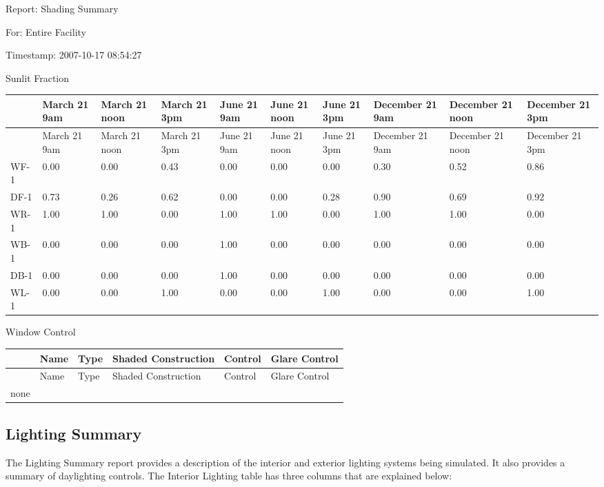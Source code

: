 Report: Shading Summary

For: Entire Facility

Timestamp: 2007-10-17 08:54:27

Sunlit Fraction

{\scriptsize
\begin{longtable}[c]{p{0.6in}p{0.6in}p{0.6in}p{0.6in}p{0.6in}p{0.6in}p{0.6in}p{0.6in}p{0.6in}p{0.6in}}
\toprule 
~ & March 21 9am & March 21 noon & March 21 3pm & June 21 9am & June 21 noon & June 21 3pm & December 21 9am & December 21 noon & December 21 3pm \tabularnewline
\midrule
\endfirsthead

\toprule 
~ & March 21 9am & March 21 noon & March 21 3pm & June 21 9am & June 21 noon & June 21 3pm & December 21 9am & December 21 noon & December 21 3pm \tabularnewline
\midrule
\endhead

WF-1 & 0.00 & 0.00 & 0.43 & 0.00 & 0.00 & 0.00 & 0.30 & 0.52 & 0.86 \tabularnewline
DF-1 & 0.73 & 0.26 & 0.62 & 0.00 & 0.00 & 0.28 & 0.90 & 0.69 & 0.92 \tabularnewline
WR-1 & 1.00 & 1.00 & 0.00 & 1.00 & 1.00 & 0.00 & 1.00 & 1.00 & 0.00 \tabularnewline
WB-1 & 0.00 & 0.00 & 0.00 & 1.00 & 0.00 & 0.00 & 0.00 & 0.00 & 0.00 \tabularnewline
DB-1 & 0.00 & 0.00 & 0.00 & 1.00 & 0.00 & 0.00 & 0.00 & 0.00 & 0.00 \tabularnewline
WL-1 & 0.00 & 0.00 & 1.00 & 0.00 & 0.00 & 1.00 & 0.00 & 0.00 & 1.00 \tabularnewline
\bottomrule
\end{longtable}}

Window Control

\begin{longtable}[c]{@{}llllll@{}}
\toprule 
~ & Name & Type & Shaded Construction & Control & Glare Control \tabularnewline
\midrule
\endfirsthead

\toprule 
~ & Name & Type & Shaded Construction & Control & Glare Control \tabularnewline
\midrule
\endhead

none & ~ & ~ & ~ & ~ & ~ \tabularnewline
\bottomrule
\end{longtable}

\subsection{Lighting Summary}\label{lighting-summary}

The Lighting Summary report provides a description of the interior and exterior lighting systems being simulated. It also provides a summary of daylighting controls. The Interior Lighting table has three columns that are explained below:

